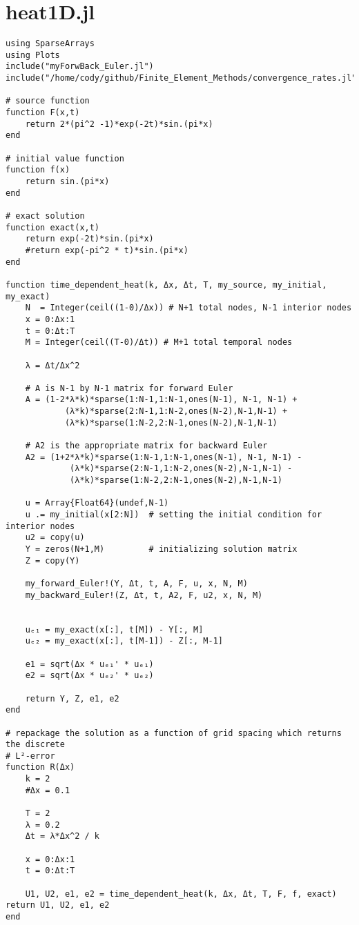 \documentclass[12pt]{article}
\begin{document}
\pagebreak
\section*{heat1D.jl}

\begin{verbatim}
using SparseArrays
using Plots
include("myForwBack_Euler.jl")
include("/home/cody/github/Finite_Element_Methods/convergence_rates.jl")

# source function
function F(x,t)
    return 2*(pi^2 -1)*exp(-2t)*sin.(pi*x)
end

# initial value function
function f(x)
    return sin.(pi*x)
end

# exact solution
function exact(x,t)
    return exp(-2t)*sin.(pi*x)
    #return exp(-pi^2 * t)*sin.(pi*x)
end

function time_dependent_heat(k, Δx, Δt, T, my_source, my_initial, my_exact)
    N  = Integer(ceil((1-0)/Δx)) # N+1 total nodes, N-1 interior nodes
    x = 0:Δx:1
    t = 0:Δt:T
    M = Integer(ceil((T-0)/Δt)) # M+1 total temporal nodes

    λ = Δt/Δx^2

    # A is N-1 by N-1 matrix for forward Euler
    A = (1-2*λ*k)*sparse(1:N-1,1:N-1,ones(N-1), N-1, N-1) +
            (λ*k)*sparse(2:N-1,1:N-2,ones(N-2),N-1,N-1) +
            (λ*k)*sparse(1:N-2,2:N-1,ones(N-2),N-1,N-1)
	
	# A2 is the appropriate matrix for backward Euler
    A2 = (1+2*λ*k)*sparse(1:N-1,1:N-1,ones(N-1), N-1, N-1) -
             (λ*k)*sparse(2:N-1,1:N-2,ones(N-2),N-1,N-1) -
             (λ*k)*sparse(1:N-2,2:N-1,ones(N-2),N-1,N-1)

    u = Array{Float64}(undef,N-1)
    u .= my_initial(x[2:N])  # setting the initial condition for interior nodes
    u2 = copy(u)
    Y = zeros(N+1,M)         # initializing solution matrix
    Z = copy(Y)

    my_forward_Euler!(Y, Δt, t, A, F, u, x, N, M)
    my_backward_Euler!(Z, Δt, t, A2, F, u2, x, N, M)


    uₑ₁ = my_exact(x[:], t[M]) - Y[:, M]
    uₑ₂ = my_exact(x[:], t[M-1]) - Z[:, M-1]

    e1 = sqrt(Δx * uₑ₁' * uₑ₁)
    e2 = sqrt(Δx * uₑ₂' * uₑ₂)

    return Y, Z, e1, e2
end

# repackage the solution as a function of grid spacing which returns the discrete
# L²-error
function R(Δx)
    k = 2
    #Δx = 0.1

    T = 2
    λ = 0.2
    Δt = λ*Δx^2 / k

    x = 0:Δx:1
    t = 0:Δt:T

    U1, U2, e1, e2 = time_dependent_heat(k, Δx, Δt, T, F, f, exact)
return U1, U2, e1, e2
end
\end{verbatim}
\end{document}
